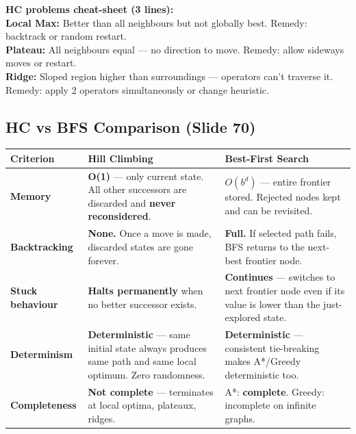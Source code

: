 \documentclass[12pt, a4paper]{article}
\newenvironment{answerbox}{\begin{mdframed}[style=answerframe]}{\end{mdframed}}
\begin{document}
\begin{answerbox}
\textbf{HC problems cheat-sheet (3 lines):}\\
\textbf{Local Max:} Better than all neighbours but not globally best. Remedy: backtrack or random restart.\\
\textbf{Plateau:} All neighbours equal — no direction to move. Remedy: allow sideways moves or restart.\\
\textbf{Ridge:} Sloped region higher than surroundings — operators can't traverse it. Remedy: apply 2 operators simultaneously or change heuristic.
\end{answerbox}

\subsection{HC vs BFS Comparison (Slide 70)}

\begin{center}
\renewcommand{\arraystretch}{1.4}
\begin{tabular}{l|p{5.8cm}|p{5.8cm}}
\toprule
\textbf{Criterion} & \textbf{Hill Climbing} & \textbf{Best-First Search} \\
\midrule
\textbf{Memory} &
  \textbf{O(1)} — only current state. All other successors are discarded and \textbf{never reconsidered}. &
  $O(b^d)$ — entire frontier stored. Rejected nodes kept and can be revisited. \\
\midrule
\textbf{Backtracking} &
  \textbf{None.} Once a move is made, discarded states are gone forever. &
  \textbf{Full.} If selected path fails, BFS returns to the next-best frontier node. \\
\midrule
\textbf{Stuck behaviour} &
  \textbf{Halts permanently} when no better successor exists. &
  \textbf{Continues} — switches to next frontier node even if its value is lower than the just-explored state. \\
\midrule
\textbf{Determinism} &
  \textbf{Deterministic} — same initial state always produces same path and same local optimum. Zero randomness. &
  \textbf{Deterministic} — consistent tie-breaking makes A*/Greedy deterministic too. \\
\midrule
\textbf{Completeness} &
  \textbf{Not complete} — terminates at local optima, plateaux, ridges. &
  A*: \textbf{complete}. Greedy: incomplete on infinite graphs. \\
\bottomrule
\end{tabular}
\end{center}
\end{document}
